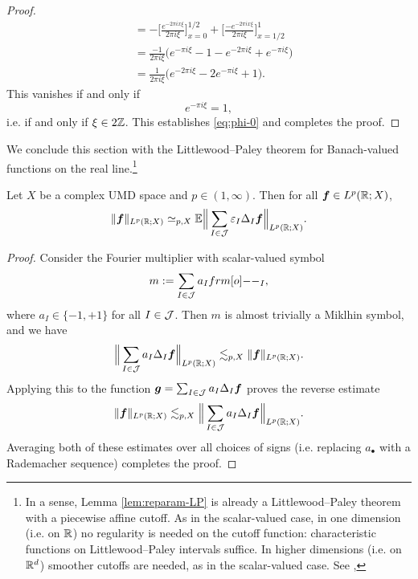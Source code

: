 \begin{proof}
\begin{equation*}
\begin{aligned}
     &= - \Big[ \frac{e^{-2\pi i x\xi}}{2\pi i \xi} \Big]_{x=0}^{1/2} + \Big[ \frac{-e^{-2\pi i x\xi}}{2\pi i \xi} \Big]_{x=1/2}^{1} \\
     &= \frac{-1}{2\pi i \xi} \Big( e^{-\pi i \xi} - 1 - e^{-2\pi i \xi} + e^{-\pi i \xi}\Big) \\
     &= \frac{1}{2\pi i \xi} \Big( e^{-2\pi i \xi} - 2e^{-\pi i \xi} + 1 \Big).
   \end{aligned}
 \end{equation*}
 This vanishes if and only if
 \begin{equation*}
   e^{-\pi i \xi} = 1,
 \end{equation*}
 i.e. if and only if $\xi \in 2\mathbb{Z}$.
 This establishes \eqref{eq:phi-0} and completes the proof.
\end{proof}

We conclude this section with the Littlewood--Paley theorem for Banach-valued functions on the real line.\footnote{In a sense, Lemma \ref{lem:reparam-LP} is already a Littlewood--Paley theorem with a piecewise affine cutoff. As in the scalar-valued case, in one dimension (i.e. on $\mathbb{R}$) no regularity is needed on the cutoff function: characteristic functions on Littlewood--Paley intervals suffice. In higher dimensions (i.e. on $\mathbb{R}^{d}$) smoother cutoffs are needed, as in the scalar-valued case. See \cite[Theorem 5.5.22]{HNVW16},}

\begin{thm}
  Let $X$ be a complex UMD space and $p \in (1,\infty)$.
  Then for all $\bm{f} \in L^p(\mathbb{R};X)$,
  \begin{equation*}
    \|\bm{f}\|_{L^p(\mathbb{R};X)} \simeq_{p,X} \mathbb{E}\Big\| \sum_{I \in \mathcal{J}} \varepsilon_{I} \Delta_{I} \bm{f} \Big\|_{L^p(\mathbb{R};X)}.
  \end{equation*}
\end{thm}

\begin{proof}
  Consider the Fourier multiplier with scalar-valued symbol
  \begin{equation*}
    m := \sum_{I \in \mc{J}} a_{I} \1_{I},
  \end{equation*}
  where $a_{I} \in \{-1,+1\}$ for all $I \in \mathcal{J}$.
  Then $m$ is almost trivially a Miklhin symbol, and we have
  \begin{equation*}
    \Big\| \sum_{I \in \mathcal{J}} a_{I} \Delta_{I} \bm{f} \Big\|_{L^p(\mathbb{R};X)} \lesssim_{p,X} \|\bm{f}\|_{L^p(\mathbb{R};X)}.
  \end{equation*}
  Applying this to the function $\bm{g} = \sum_{I \in \mathcal{J}} a_{I} \Delta_{I} \bm{f}$ proves the reverse estimate
  \begin{equation*}
    \|\bm{f}\|_{L^p(\mathbb{R};X)} \lesssim_{p,X} \Big\| \sum_{I \in \mathcal{J}} a_{I} \Delta_{I} \bm{f} \Big\|_{L^p(\mathbb{R};X)}.
  \end{equation*}
  Averaging both of these estimates over all choices of signs (i.e. replacing $a_{\bullet}$ with a Rademacher sequence) completes the proof.
\end{proof}


